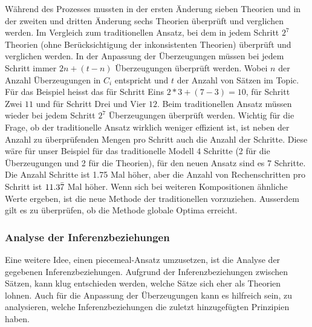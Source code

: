 \documentclass{article}
\begin{document}
 Während des Prozesses mussten in der ersten Änderung sieben Theorien und in der zweiten und dritten Änderung sechs Theorien überprüft und verglichen werden.  Im Vergleich zum traditionellen Ansatz, bei dem in jedem Schritt $2^7$ Theorien (ohne Berücksichtigung der inkonsistenten Theorien) überprüft und verglichen werden. In der Anpassung der Überzeugungen müssen bei jedem Schritt immer $2n + (t-n)$ Überzeugungen überprüft werden. Wobei $n$ der Anzahl Überzeugungen in $C_i$ entspricht und $t$ der Anzahl von Sätzen im Topic. Für das Beispiel heisst das für Schritt Eins $2*3 + (7-3) = 10$, für Schritt Zwei $11$ und für Schritt Drei und Vier $12$. Beim traditionellen Ansatz müssen wieder bei jedem Schritt $2^7$ Überzeugungen überprüft werden. Wichtig für die Frage, ob der traditionelle Ansatz wirklich weniger effizient ist, ist neben der Anzahl zu überprüfenden Mengen pro Schritt auch die Anzahl der Schritte. Diese wäre für unser Beispiel für das traditionelle Modell 4 Schritte (2 für die Überzeugungen und 2 für die Theorien), für den neuen Ansatz sind es 7 Schritte. Die Anzahl Schritte ist 1.75 Mal höher, aber die Anzahl von Rechenschritten pro Schritt ist $11.3\Bar{7}$ Mal höher. Wenn sich bei weiteren Kompositionen ähnliche Werte ergeben, ist die neue Methode der traditionellen vorzuziehen. Ausserdem gilt es zu überprüfen, ob die Methode globale Optima erreicht.

\subsubsection{Analyse der Inferenzbeziehungen}
Eine weitere Idee, einen piecemeal-Ansatz umzusetzen, ist die Analyse der gegebenen Inferenzbeziehungen. Aufgrund der Inferenzbeziehungen zwischen Sätzen, kann klug entschieden werden, welche Sätze sich eher als Theorien lohnen. Auch für die Anpassung der Überzeugungen kann es hilfreich sein, zu analysieren, welche Inferenzbeziehungen die zuletzt hinzugefügten Prinzipien haben.
\end{document}
